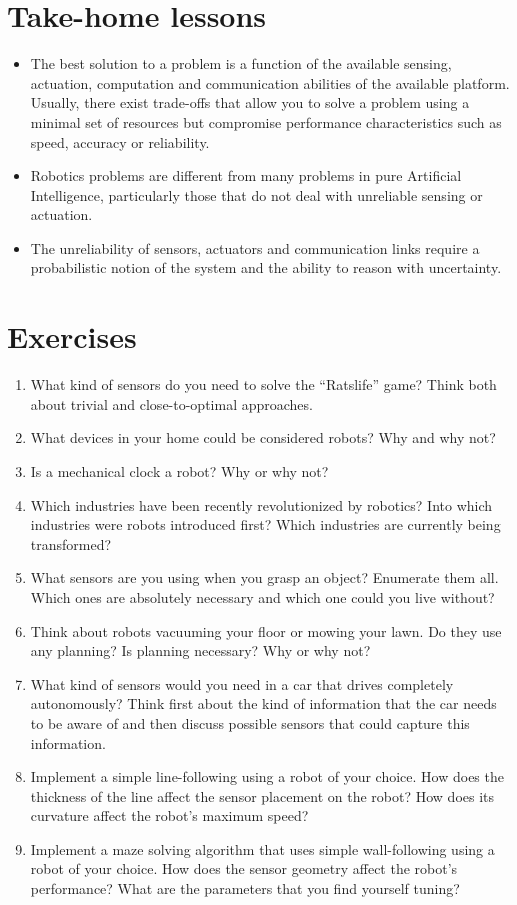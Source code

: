 \section*{Take-home lessons}
\begin{itemize}
\item The best solution to a problem is a function of the available sensing, actuation, computation and communication abilities of the available platform. Usually, there exist trade-offs that allow you to solve a problem using a minimal set of resources but compromise performance characteristics such as speed, accuracy or reliability.
\item Robotics problems are different from many problems in pure Artificial Intelligence, particularly those that do not deal with unreliable sensing or actuation.
\item The unreliability of sensors, actuators and communication links require a probabilistic notion of the system and the ability to reason with uncertainty.
\end{itemize}

\section*{Exercises}\small
\begin{enumerate}
\item What kind of sensors do you need to solve the ``Ratslife'' game? Think both about trivial and close-to-optimal approaches.
\item What devices in your home could be considered robots? Why and why not?
\item Is a mechanical clock a robot? Why or why not?
\item Which industries have been recently revolutionized by robotics? Into which industries were robots introduced first? Which industries are currently being transformed?
\item What sensors are you using when you grasp an object? Enumerate them all. Which ones are absolutely necessary and which one could you live without?
\item Think about robots vacuuming your floor or mowing your lawn. Do they use any planning? Is planning necessary? Why or why not?
\item What kind of sensors would you need in a car that drives completely autonomously? Think first about the kind of information that the car needs to be aware of and then discuss possible sensors that could capture this information.
\item Implement a simple line-following using a robot of your choice. How does the thickness of the line affect the sensor placement on the robot? How does its curvature affect the robot's maximum speed?
\item Implement a maze solving algorithm that uses simple wall-following using a robot of your choice. How does the sensor geometry affect the robot's performance? What are the parameters that you find yourself tuning?
\end{enumerate}\normalsize

